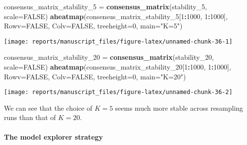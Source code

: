 \documentclass[9pt,a4paper,]{extarticle}
\newenvironment{Shaded}{\begin{snugshade}}{\end{snugshade}}
\newcommand{\DataTypeTok}[1]{\textcolor[rgb]{0.13,0.29,0.53}{#1}}
\newcommand{\DecValTok}[1]{\textcolor[rgb]{0.00,0.00,0.81}{#1}}
\newcommand{\KeywordTok}[1]{\textcolor[rgb]{0.13,0.29,0.53}{\textbf{#1}}}
\newcommand{\NormalTok}[1]{#1}
\newcommand{\OperatorTok}[1]{\textcolor[rgb]{0.81,0.36,0.00}{\textbf{#1}}}
\newcommand{\OtherTok}[1]{\textcolor[rgb]{0.56,0.35,0.01}{#1}}
\newcommand{\StringTok}[1]{\textcolor[rgb]{0.31,0.60,0.02}{#1}}
\begin{document}
\begin{Shaded}
\begin{Highlighting}[]
\NormalTok{consensus_matrix_stability_}\DecValTok{5}\NormalTok{ =}\StringTok{ }\KeywordTok{consensus_matrix}\NormalTok{(stability_}\DecValTok{5}\NormalTok{,}
                        \DataTypeTok{scale=}\OtherTok{FALSE}\NormalTok{)}
\KeywordTok{aheatmap}\NormalTok{(consensus_matrix_stability_}\DecValTok{5}\NormalTok{[}\DecValTok{1}\OperatorTok{:}\DecValTok{1000}\NormalTok{, }\DecValTok{1}\OperatorTok{:}\DecValTok{1000}\NormalTok{], }\DataTypeTok{Rowv=}\OtherTok{FALSE}\NormalTok{,}
     \DataTypeTok{Colv=}\OtherTok{FALSE}\NormalTok{,}
     \DataTypeTok{treeheight=}\DecValTok{0}\NormalTok{, }\DataTypeTok{main=}\StringTok{"K=5"}\NormalTok{)}
\end{Highlighting}
\end{Shaded}

\begin{center}\texttt{[image: reports/manuscript\_files/figure-latex/unnamed-chunk-36-1]} \end{center}

\begin{Shaded}
\begin{Highlighting}[]
\NormalTok{consensus_matrix_stability_}\DecValTok{20}\NormalTok{ =}\StringTok{ }\KeywordTok{consensus_matrix}\NormalTok{(stability_}\DecValTok{20}\NormalTok{,}
                         \DataTypeTok{scale=}\OtherTok{FALSE}\NormalTok{)}
\KeywordTok{aheatmap}\NormalTok{(consensus_matrix_stability_}\DecValTok{20}\NormalTok{[}\DecValTok{1}\OperatorTok{:}\DecValTok{1000}\NormalTok{, }\DecValTok{1}\OperatorTok{:}\DecValTok{1000}\NormalTok{], }\DataTypeTok{Rowv=}\OtherTok{FALSE}\NormalTok{,}
     \DataTypeTok{Colv=}\OtherTok{FALSE}\NormalTok{,}
     \DataTypeTok{treeheight=}\DecValTok{0}\NormalTok{, }\DataTypeTok{main=}\StringTok{"K=20"}\NormalTok{)}
\end{Highlighting}
\end{Shaded}

\begin{center}\texttt{[image: reports/manuscript\_files/figure-latex/unnamed-chunk-36-2]} \end{center}

We can see that the choice of \(K=5\) seems much more stable across resampling runs than that of \(K=20\).

\hypertarget{the-model-explorer-strategy}{%
\paragraph{The model explorer strategy}\label{the-model-explorer-strategy}}
\end{document}
